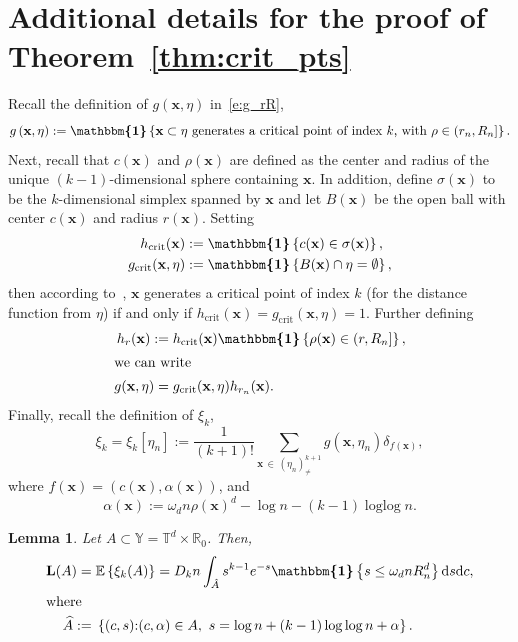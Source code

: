 \documentclass[10pt]{amsart}
\newtheorem{lemm}[theo]{Lemma}\newtheorem{prop}[theo]{Proposition}\newtheorem{coro}[theo]{Corollary}\newtheorem{conj}[theo]{Conjecture}
\theoremstyle{definition}\newtheorem{defi}[theo]{Definition}\newtheorem{rema}[theo]{Remark}\newtheorem{exam}[theo]{Example}\newtheorem{exem}[theo]{Example}\newtheorem{nota}[theo]{Notation}
\DeclareMathOperator{\logg}{\log\log}
\newcommand*\bL{\mathbf{L}}
\newcommand{\bx}{\mathbf{x}}
\newcommand*\R{\mathbb{R}}
\newcommand*\T{\mathbb{T}}
\newcommand*\Y{\mathbb{Y}}
\newcommand{\E}{\mathbb{E}}
\newcommand*\md{\mathrm{d}}
\newcommand{\mean}[1] {\E\left\{{#1}\right\}}
\newcommand{\ind}{\boldsymbol{\mathbbm{1}}}
\newcommand{\indf}[1]{\ind\set{#1}}
\newcommand{\set}[1]{\left\{#1\right\}}
\newcommand*\gcrit{g_{\mathrm{crit}}}
\newcommand*\hcrit{h_{\mathrm{crit}}}
\let\oldhat\hat
\renewcommand*{\hat}[1]{\mathchoice{\widehat{#1}}{\widehat{#1}}{\oldhat{#1}}{\oldhat{#1}}}
\begin{document}
\appendix

\section{Additional details for the proof of Theorem~\ref{thm:crit_pts}} 
Recall the definition of $g(\bx,\eta)$ in~\eqref{e:g_rR},
\[
g\left(\bx, \eta\right) := \ind\set{\bx\subset \eta \text{ generates a critical point of index $k$, with }\rho\in \left(r_n,R_n\right]}.
\]
Next, recall that $c(\bx)$ and $\rho(\bx)$ are defined as the center and radius of the unique $(k-1)$-dimensional sphere containing $\bx$. In addition, define $\sigma(\bx)$ to be the $k$-dimensional simplex spanned by $\bx$ and let $B(\bx)$ be the open ball with center $c(\bx)$ and radius $r(\bx)$. Setting
\begin{align*}
\hcrit(\bx) &:= \indf{c(\bx)\in \sigma(\bx)},\\
\gcrit(\bx,\eta) &:= \indf{B(\bx)\cap \eta = \emptyset},
\end{align*}
then according to~\cite[Lemma~2.4]{bobrowski2017}, $\bx$ generates a critical point of index $k$ (for the distance function from $\eta$) if and only if $\hcrit(\bx)=\gcrit(\bx,\eta)=1$. Further defining
\begin{align}
h_r(\bx) :=& \;\hcrit(\bx)\ind\set{\rho(\bx)\in \left(r,R_n\right]},\nonumber\\
\intertext{we can write}
g(\bx,\eta) =& \;\gcrit(\bx,\eta)h_{r_n}(\bx).\label{eqn:def_g}
\end{align}
Finally, recall the definition of $\xi_k$,
\[
\xi_k = \xi_k\left[\eta_n\right] := \frac{1}{(k+1)!} \sum_{\bx\,\in\,\left(\eta_n\right)^{k+1}_{\ne}} g\left(\bx,\eta_n\right) \delta_{f(\bx)},
\]
where $f(\bx) = (c(\bx),\alpha(\bx))$, and
\[
\alpha(\bx) := \omega_d n\rho(\bx)^d - \log n - (k-1)\logg n.
\]

\begin{lemm}\label{lem:L_A}
Let $A \subset \Y = \T^d\times\R_0$. Then,
\begin{align*}
\bL(A) =&\; \mean{\xi_k(A)} = D_k n \int_{\hat A} s^{k-1}e^{-s} \ind\set{s\le \omega_d n R_n^d } \md s \md c,\\
\intertext{where}
\hat A :=&\; \set{(c,s) {:} (c,\alpha)\in A,\ s = \log n + (k-1)\logg n + \alpha}.
\end{align*}
\end{lemm}
\end{document}
